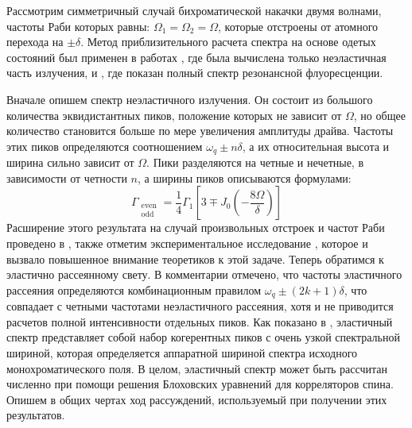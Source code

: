 Рассмотрим симметричный случай бихроматической накачки двумя волнами, частоты Раби которых равны: $\Omega_1=\Omega_2=\Omega$, которые отстроены от атомного перехода на $\pm \delta$. Метод приблизительного расчета спектра на основе одетых состояний был применен в работах \cite{Freedhoff_resonance}, где была вычислена только неэластичная часть излучения, и \cite{Agarwal:91}, где показан полный спектр резонансной флуоресценции. 

Вначале опишем спектр неэластичного излучения. Он состоит из большого количества эквидистантных пиков, положение которых не зависит от $\Omega$, но общее количество становится больше по мере увеличения амплитуды драйва. Частоты этих пиков определяются соотношением $\omega_q \pm n\delta$, а их  относительная высота и ширина сильно зависит от $\Omega$. Пики разделяются на четные и нечетные, в зависимости от четности $n$, а ширины пиков описываются формулами:
\begin{equation}
\Gamma_{{\substack{\text{even}\\ \text{odd} }}} = \frac{1}{4}\Gamma_1\left[3\mp J_0\left(-\frac{8\Omega}{\delta}\right)\right]
\end{equation}
Расширение этого результата на случай произвольных отстроек и частот Раби проведено в \cite{Ficek_resonance}, также отметим экспериментальное исследование \cite{Zhu_experiment}, которое и вызвало повышенное внимание 
теоретиков к этой задаче. 
Теперь обратимся к эластично рассеянному свету. В комментарии \cite{Comment_resonance} отмечено, что частоты эластичного рассеяния определяются комбинационным правилом $\omega_q \pm (2k+1)\delta$, что совпадает с четными частотами неэластичного рассеяния, хотя и не приводится расчетов полной интенсивности отдельных пиков.
Как показано в \cite{Agarwal:91}, эластичный спектр представляет собой набор  когерентных пиков с очень узкой спектральной шириной, которая определяется аппаратной шириной спектра исходного монохроматического поля. В целом, эластичный спектр может быть рассчитан численно при помощи решения Блоховских уравнений для корреляторов спина. Опишем в общих чертах ход рассуждений, используемый при получении этих результатов. 

